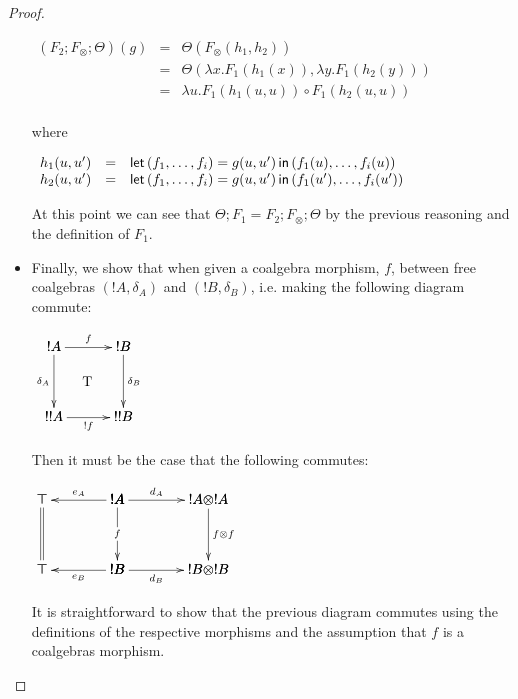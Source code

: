 \begin{proof}
\begin{report}
\begin{itemize}
    \begin{center}
      \begin{math}
        \begin{array}{lll}
          (F_2;F_\otimes;\Theta)(g)
          & = & \Theta(F_\otimes(h_1,h_2))\\
          & = & \Theta(\lambda x.F_1(h_1(x)), \lambda y.F_1(h_2(y)))\\
          & = & \lambda u.F_1(h_1(u,u)) \circ F_1(h_2(u,u))\\
        \end{array}
      \end{math}
    \end{center}
    where
    \begin{center}
      \begin{math}
        \begin{array}{lll}
          h_1(u,u') & = & \mathsf{let}\, (f_1,\ldots,f_i) = g(u,u') \,\mathsf{in}\, (f_1(u),\ldots,f_i(u))\\
          h_2(u,u') & = & \mathsf{let}\, (f_1,\ldots,f_i) = g(u,u') \,\mathsf{in}\, (f_1(u'),\ldots,f_i(u'))\\
        \end{array}        
      \end{math}
    \end{center}
    At this point we can see that $\Theta;F_1 = F_2;F_\otimes;\Theta$
    by the previous reasoning and the definition of $F_1$.

  \item Finally, we show that when given a coalgebra morphism, $f$,
    between free coalgebras $(!A,\delta_A)$ and $(!B,\delta_B)$,
    i.e. making the following diagram commute:
    \begin{center}
    \begin{math}
      \bfig
      \square/->`->`->`->/[!A`!B`!!A`!!B;f`\delta_A`\delta_B`!f]
      \place(240,250)[\text{T}]        
      \efig
    \end{math}
    \end{center}
    Then it must be the case that the following commutes:
    \begin{center}
      \begin{math}
        \bfig
        \hSquares/<-`->`=`->`->`<-`->/[\top`!A`!A \otimes !A`\top`!B`!B \otimes !B;e_A`d_A``f`f \otimes f`e_B`d_B]
        \efig                
      \end{math}
    \end{center}
    It is straightforward to show that the previous diagram commutes
    using the definitions of the respective morphisms and the 
    assumption that $f$ is a coalgebras morphism.
  \end{itemize}   
\end{report}
\end{proof}

